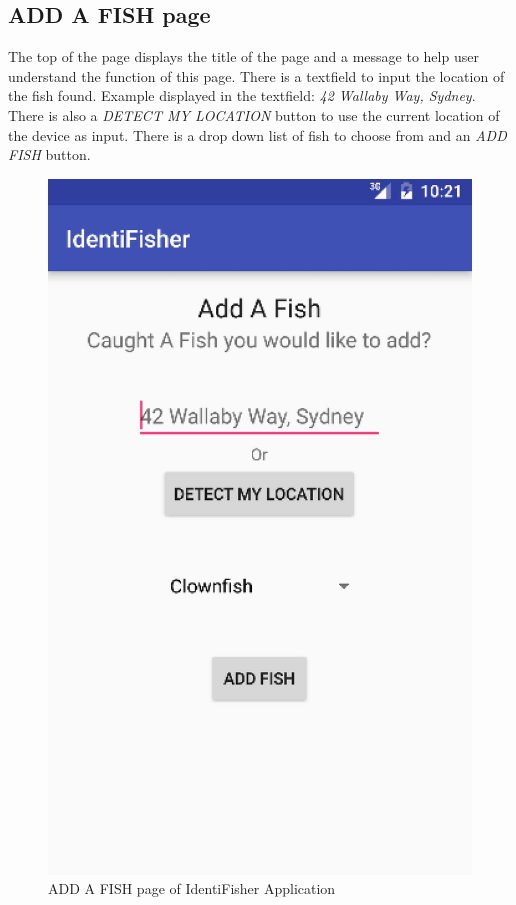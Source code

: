 \documentclass{article}
\begin{document}
\subsection{ADD A FISH page}
The top of the page displays the title of the page and a message to help user understand the function of this page. There is a textfield to input the
location of the fish found. Example displayed in the textfield: \textit{42 Wallaby Way, Sydney}. There is also a \textit{DETECT MY LOCATION} button
to use the current location of the device as input. There is a drop down list of fish to choose from and an \textit{ADD FISH} button.\\
\begin{figure}[H]
	\includegraphics[scale=0.30]{AddFish.png}
	\caption{ADD A FISH page of IdentiFisher Application}
\end{figure}
\end{document}
